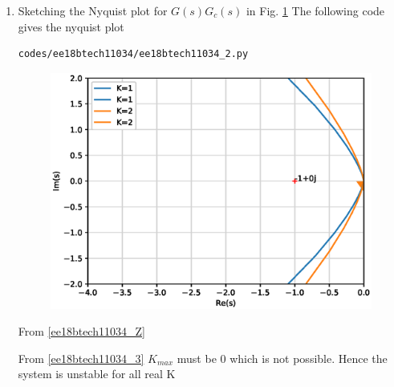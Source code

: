 \begin{enumerate}[label=\thesubsection.\arabic*.,ref=\thesubsection.\theenumi]
\item Sketching the Nyquist plot for $G(s)G_c(s)$ in Fig. \ref{fig:ee18btech11034_2}
The following code gives the nyquist plot
\begin{lstlisting}
codes/ee18btech11034/ee18btech11034_2.py
\end{lstlisting}
\begin{figure}[!h]
\centering
\includegraphics[width=\columnwidth]{./figs/ee18btech11034/ee18btech11034_2.eps}
\caption{}
\label{fig:ee18btech11034_2}
\end{figure}
From \eqref{ee18btech11034_Z}

\begin{table}[!ht]
\centering

\caption{}
\label{table:ee18btech11034_table2}
\end{table}
From \eqref{ee18btech11034_3} $K_{max}$ must be 0 which is not possible.
Hence the system is unstable for all real K
\end{enumerate}

